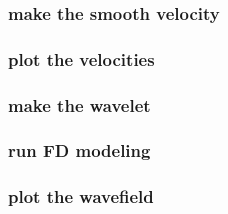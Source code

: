 \begin{frame} \frametitle{make the smooth velocity}
\end{frame}
\cwpnote{}

\begin{frame} \frametitle{plot the velocities}
\end{frame}
\cwpnote{}

\begin{frame}
\end{frame}
\begin{frame}
\end{frame}

\begin{frame} \frametitle{make the wavelet}
\end{frame}
\cwpnote{}

\begin{frame}
\end{frame}

\begin{frame} \frametitle{run FD modeling}
\end{frame}
\cwpnote{}

\begin{frame} \frametitle{plot the wavefield}
\end{frame}
\cwpnote{}

